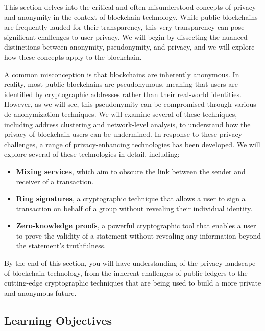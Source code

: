 This section delves into the critical and often misunderstood concepts
of privacy and anonymity in the context of blockchain technology. While
public blockchains are frequently lauded for their transparency, this
very transparency can pose significant challenges to user privacy. We
will begin by dissecting the nuanced distinctions between anonymity,
pseudonymity, and privacy, and we will explore how these concepts apply
to the blockchain.

A common misconception is that blockchains are inherently anonymous. In
reality, most public blockchains are pseudonymous, meaning that users
are identified by cryptographic addresses rather than their real-world
identities. However, as we will see, this pseudonymity can be
compromised through various de-anonymization techniques. We will examine
several of these techniques, including address clustering and
network-level analysis, to understand how the privacy of blockchain
users can be undermined.
%
In response to these privacy challenges, a range of privacy-enhancing
technologies has been developed. We will explore several of these
technologies in detail, including:

\begin{itemize}
\tightlist
\item
  \textbf{Mixing services}, which aim to obscure the link between the
  sender and receiver of a transaction.
\item
  \textbf{Ring signatures}, a cryptographic technique that allows a user
  to sign a transaction on behalf of a group without revealing their
  individual identity.
\item
  \textbf{Zero-knowledge proofs}, a powerful cryptographic tool that
  enables a user to prove the validity of a statement without revealing
  any information beyond the statement's truthfulness.
\end{itemize}

By the end of this section, you will have understanding
of the privacy landscape of blockchain technology, from the inherent
challenges of public ledgers to the cutting-edge cryptographic
techniques that are being used to build a more private and anonymous
future.

\subsection{Learning Objectives}\label{learning-objectives}

